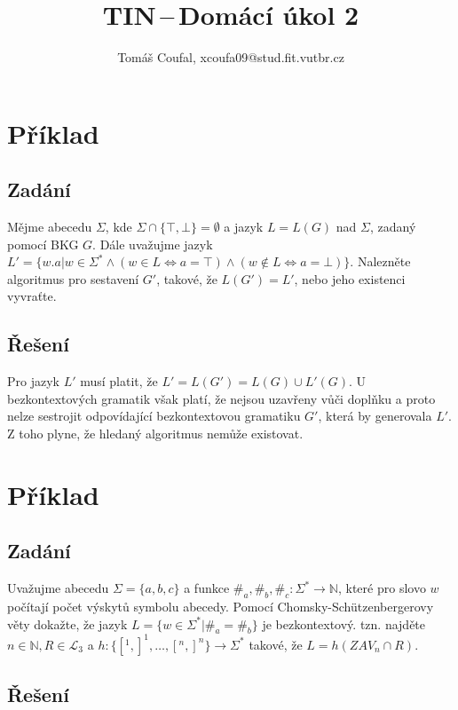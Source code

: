 \documentclass[11pt, a4paper]{article}
\title{TIN\,--\,Domácí úkol 2}
\author{Tomáš Coufal, xcoufa09@stud.fit.vutbr.cz}
\begin{document}
\maketitle
\section{Příklad}
\subsection*{Zadání}
Mějme abecedu $ \Sigma $, kde $ \Sigma \cap \{\top, \bot \} = \emptyset $ a jazyk $ L = L(G) $ nad $ \Sigma $, zadaný pomocí BKG $ G $. Dále uvažujme jazyk $ L' = \{w.a | w \in \Sigma^* \wedge (w \in L \Leftrightarrow a = \top) \wedge (w \notin L \Leftrightarrow a = \bot) \} $. Nalezněte algoritmus pro sestavení $ G'$, takové, že $ L(G') = L'$, nebo jeho existenci vyvraťte.
\subsection*{Řešení}
Pro jazyk $ L' $ musí platit, že $ L' =  L(G') = L(G) \cup L'(G) $. U bezkontextových gramatik však platí, že nejsou uzavřeny vůči doplňku a proto nelze sestrojit odpovídající bezkontextovou gramatiku $ G' $, která by generovala $ L' $. Z toho plyne, že hledaný algoritmus nemůže existovat.

\clearpage
\maketitle
\section{Příklad}
\subsection*{Zadání}
Uvažujme abecedu $\Sigma = \{a, b, c\}$ a funkce $\#_a, \#_b, \#_c: \Sigma^* \rightarrow \mathbb{N}$, které pro slovo $w$ počítají počet výskytů symbolu abecedy. Pomocí Chomsky-Sch\"utzenbergerovy věty dokažte, že jazyk $L = \{w \in \Sigma^* | \#_a = \#_b\}$ je bezkontextový. tzn. najděte $n \in \mathbb{N}, R \in \mathcal{L}_3$ a $h: \{[^1,]^1,\ldots, [^n,]^n\} \rightarrow \Sigma^*$ takové, že $L = h(ZAV_n \cap R)$.
\subsection*{Řešení}
\end{document}
